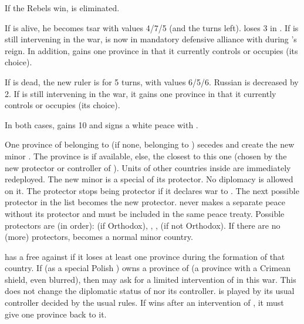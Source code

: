 \aparag If the Rebels win,  is eliminated.

\bparag If \leaderDmitry is alive, he becomes tsar \monarqueDimitri with
values 4/7/5 (and the turns left). \RUS loses 3 in \STAB.  If \POL is still
intervening in the war, \RUS is now in mandatory defensive alliance with \POL
during \monarqueDimitri's reign. In addition, \POL gains one province in \RUS
that it currently controls or occupies (its choice).

\bparag If \leaderDmitry is dead, the new ruler is \monarqueRomanov for 5
turns, with values 6/5/6. Russian \STAB is decreased by 2.  If \POL is still
intervening in the war, it gains one province in \RUS that it currently
controls or occupies (its choice).

\bparag In both cases, \POL gains 10 \PV and signs a white peace with \RUS.







\phevnt
\aparag One province of \paysUkraine belonging to \POL (if none, belonging to
\HAB) secedes and create the new minor \paysukraine. The province is
\provincePoltava if available, else, the closest to this one (chosen by the
new protector or controller of \paysUkraine). Units of other countries inside
are immediately redeployed.
\aparag The new minor is a special \VASSAL of its protector. No diplomacy is
allowed on it.
\bparag The protector stops being protector if it declares war to
\paysukraine. The next possible protector in the list becomes the new
protector.
\aparag \paysUkraine never makes a separate peace without its protector and
must be included in the same peace treaty.
\aparag Possible protectors are (in order): \POL (if Orthodox), \RUS, \TUR,
\POL (if not Orthodox). If there are no (more) protectors, \paysUkraine
becomes a normal minor country.

\phdipl
\aparag \POL has a free \CB against \paysUkraine if it loses at least one
province during the formation of that country.
\aparag If \paysUkraine (as a special Polish \VASSAL) owns a province of
\paysCrimee (a province with a Crimean shield, even blurred), then \POL may
ask for a limited intervention of \paysCrimee in this war.
\bparag This does not change the diplomatic status of \paysCrimee nor its
controller. \paysCrimee is played by its usual controller decided by the usual
rules.
\bparag If \POL wins after an intervention of \paysCrimee, it must give one
province back to it.

